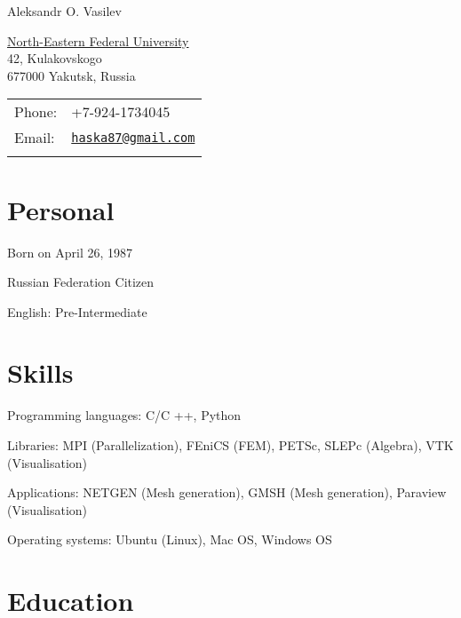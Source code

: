 \documentclass[a4paper]{article}
\def\name{Aleksandr O. Vasilev}
\renewenvironment{itemize}{
  \begin{list}{}{
    \setlength{\leftmargin}{1.5em}
  }
}{
  \end{list}
}
\begin{document}
{\huge \name}


\vspace{0.25in}

\begin{minipage}{0.45\linewidth}
  \href{http://www.s-vfu.ru/user/user.php?id=732071}{North-Eastern Federal University} \\
  42, Kulakovskogo \\
  677000 Yakutsk, Russia
\end{minipage}
\begin{minipage}{0.45\linewidth}
  \begin{tabular}{ll}
    Phone: & +7-924-1734045 \\
    Email: & \href{mailto:haska87@gmail.com}{\tt haska87@gmail.com}  \\ \\
  \end{tabular}
\end{minipage}

\section*{Personal}

\begin{itemize}
\item Born on April 26, 1987
\item Russian Federation Citizen
\item English: Pre-Intermediate
\end{itemize}

\section*{Skills}

\begin{itemize}
\item Programming languages: C/C ++, Python
\item Libraries: MPI (Parallelization), FEniCS (FEM), PETSc, SLEPc (Algebra), VTK (Visualisation)
\item Applications: NETGEN (Mesh generation), GMSH (Mesh generation), Paraview (Visualisation)
\item Operating systems: Ubuntu (Linux), Mac OS, Windows OS
\end{itemize}


\section*{Education}
\end{document}
